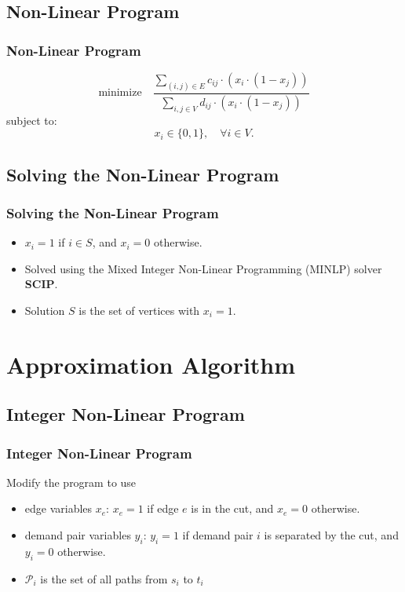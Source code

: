 \documentclass{beamer}
\begin{document}
\subsection{Non-Linear Program}
\begin{frame}[allowframebreaks]
\frametitle{Non-Linear Program}
\centering
    \[
    \text{minimize} \quad \frac{\sum \limits_{(i,j) \in E} c_{ij} \cdot (x_{i} \cdot (1 - x_{j}))}{\sum \limits_{i,j \in V} d_{ij} \cdot (x_{i} \cdot (1 - x_{j}))}
    \]
    subject to:
    \[
    x_{i} \in \{0, 1\}, \quad \forall i \in V.
    \]
\end{frame}

\subsection{Solving the Non-Linear Program}
\begin{frame}[allowframebreaks]
    \frametitle{Solving the Non-Linear Program}
    \begin{itemize}
        \item $x_i = 1$ if $i \in S$, and $x_i = 0$ otherwise.
        \item Solved using the Mixed Integer Non-Linear Programming (MINLP) solver \textbf{SCIP}.
        \item Solution $S$ is the set of vertices with $x_i = 1$.
    \end{itemize}
\end{frame}

\section{Approximation Algorithm}
\subsection{Integer Non-Linear Program}
\begin{frame}[allowframebreaks]
\frametitle{Integer Non-Linear Program}
Modify the program to use
\begin{itemize}
    \item edge variables $x_{e}$: $x_{e} = 1$ if edge $e$ is in the cut, and $x_{e} = 0$ otherwise.
    \item demand pair variables $y_{i}$: $y_{i} = 1$ if demand pair $i$ is separated by the cut, and $y_{i} = 0$ otherwise.
    \item $\mathcal{P}_{i}$ is the set of all paths from $s_i$ to $t_i$
\end{itemize}
\end{frame}
\end{document}
